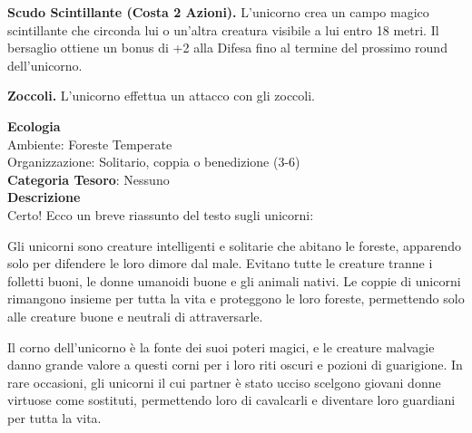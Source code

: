 \begin{multicols}{2}
{\textbf{Scudo Scintillante (Costa 2 Azioni).} L'unicorno crea un campo magico scintillante che circonda lui o un'altra creatura visibile a lui entro 18 metri. Il bersaglio ottiene un bonus di +2 alla Difesa fino al termine del prossimo round dell'unicorno.

\textbf{Zoccoli.} L'unicorno effettua un attacco con gli zoccoli.

\textbf{Ecologia}\\
Ambiente: Foreste Temperate\\
Organizzazione: Solitario, coppia o benedizione (3-6)\\
\textbf{Categoria Tesoro}: Nessuno\\
\textbf{Descrizione}\\
Certo! Ecco un breve riassunto del testo sugli unicorni:

Gli unicorni sono creature intelligenti e solitarie che abitano le foreste, apparendo solo per difendere le loro dimore dal male. Evitano tutte le creature tranne i folletti buoni, le donne umanoidi buone e gli animali nativi. Le coppie di unicorni rimangono insieme per tutta la vita e proteggono le loro foreste, permettendo solo alle creature buone e neutrali di attraversarle.

Il corno dell'unicorno è la fonte dei suoi poteri magici, e le creature malvagie danno grande valore a questi corni per i loro riti oscuri e pozioni di guarigione. In rare occasioni, gli unicorni il cui partner è stato ucciso scelgono giovani donne virtuose come sostituti, permettendo loro di cavalcarli e diventare loro guardiani per tutta la vita.



}
\end{multicols}
